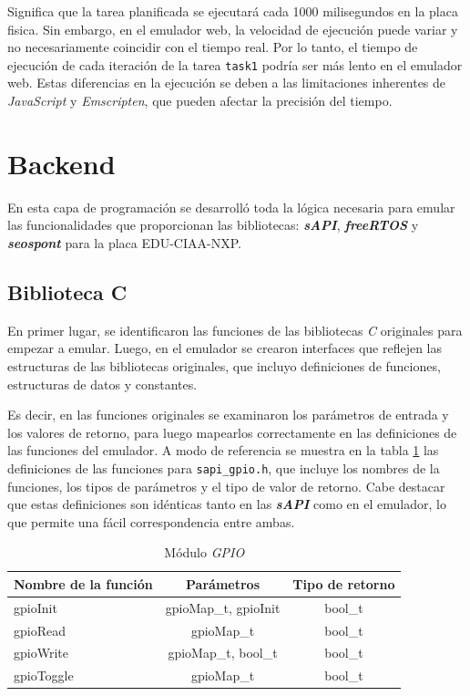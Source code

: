 Significa que la tarea  planificada se ejecutará cada 1000 milisegundos en la placa fisica. Sin embargo, en el emulador web, la velocidad de ejecución puede variar y no necesariamente coincidir con el tiempo real. Por lo tanto, el tiempo de ejecución de cada iteración de la tarea \texttt{task1} podría ser más lento en el emulador web. Estas diferencias en la ejecución se deben a las limitaciones inherentes de \textit{JavaScript} y \textit{Emscripten}, que pueden afectar la precisión del tiempo.


\section{Backend}

En esta capa de programación se desarrolló toda la lógica necesaria para emular las funcionalidades que proporcionan las bibliotecas: \textit{\textbf{sAPI}}, \textit{\textbf{freeRTOS}} y \textit{\textbf{seos\textunderscore pont}} para la placa EDU-CIAA-NXP.


\subsection{Biblioteca C}

En primer lugar, se identificaron las funciones de las bibliotecas \textit{C} originales para empezar a emular. Luego, en el emulador se crearon interfaces que reflejen las estructuras de las bibliotecas originales, que incluyo definiciones de funciones, estructuras de datos y constantes.

Es decir, en las funciones originales se examinaron los parámetros de entrada y los valores de retorno, para luego mapearlos correctamente en las definiciones de las funciones del emulador.  A modo de referencia se muestra en la tabla \ref{tab:gpioMap} las definiciones de las funciones para \texttt{sapi\_gpio.h}, que incluye los nombres de la funciones, los tipos de parámetros y el tipo de valor de retorno. Cabe destacar que estas definiciones son idénticas tanto en las \textit{\textbf{sAPI}} como en el emulador, lo que permite una fácil correspondencia entre ambas.


\begin{table}[h]
	\centering
	\caption[Módulo \textit{GPIO}]{Módulo \textit{GPIO}}
	\begin{tabular}{l c c}    
		\toprule
		\textbf{Nombre de la función} 	 & \textbf{Parámetros} 		& \textbf{Tipo de retorno}  \\
		\midrule
		gpioInit & gpioMap\_t, gpioInit				&  bool\_t \\		
		gpioRead	 & gpioMap\_t				&  bool\_t \\
		gpioWrite	 & gpioMap\_t, bool\_t				&  bool\_t \\
		gpioToggle	 & gpioMap\_t				&  bool\_t \\
		\bottomrule
		\hline
	\end{tabular}
	\label{tab:gpioMap}
\end{table}



